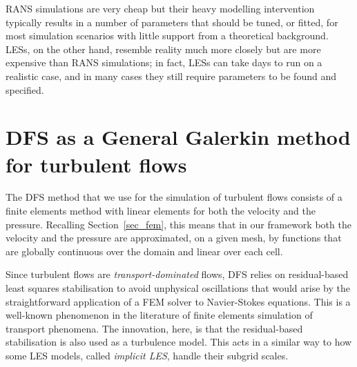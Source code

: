 RANS simulations are very cheap but their heavy modelling intervention typically results in a number of parameters that should be tuned, or fitted, for most simulation scenarios with little support from a theoretical background.
LESs, on the other hand, resemble reality much more closely but are more expensive than RANS simulations; in fact, LESs can take days to run on a realistic case, and in many cases they still require parameters to be found and specified.

\section{DFS as a General Galerkin method for turbulent flows}
\label{sec_G2}
The DFS method that we use for the simulation of turbulent flows consists of a finite elements method with linear elements for both the velocity and the pressure.
Recalling Section~\ref{sec_fem}, this means that in our framework both the velocity and the pressure are approximated, on a given mesh, by functions that are globally continuous over the domain and linear over each cell.

Since turbulent flows are \emph{transport-dominated} flows, DFS relies on residual-based least squares stabilisation to avoid unphysical oscillations that would arise by the straightforward application of a FEM solver to Navier-Stokes equations.
This is a well-known phenomenon in the literature of finite elements simulation of transport phenomena.
The innovation, here, is that the residual-based stabilisation is also used as a turbulence model.
This acts in a similar way to how some LES models, called \emph{implicit LES}, handle their subgrid scales.

